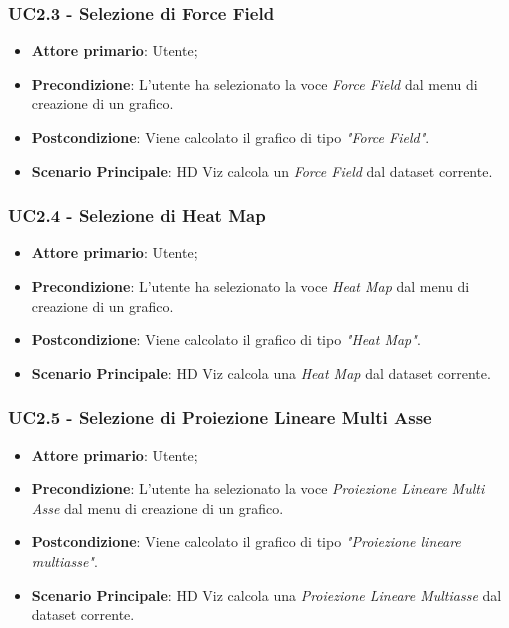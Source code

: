 \subsubsection{UC2.3 - Selezione di Force Field}
\label{ssub:uc2.3}
\begin{itemize}

    \item \textbf{Attore primario}: Utente;

    \item \textbf{Precondizione}:   L'utente ha selezionato la voce \emph{Force Field} dal menu di creazione di un grafico.

    \item \textbf{Postcondizione}:  Viene calcolato il grafico di tipo \emph{"Force Field"}.
	
	\item \textbf{Scenario Principale}: HD Viz calcola un \emph{Force Field} dal dataset corrente.

\end{itemize}


\subsubsection{UC2.4 - Selezione di Heat Map}
\label{ssub:uc2.4}
\begin{itemize}

    \item \textbf{Attore primario}: Utente;

	\item \textbf{Precondizione}:   L'utente ha selezionato la voce \emph{Heat Map} dal menu di creazione di un grafico.

    \item \textbf{Postcondizione}:  Viene calcolato il grafico di tipo \emph{"Heat Map"}.

	\item \textbf{Scenario Principale}: HD Viz calcola una \emph{Heat Map} dal dataset corrente.

\end{itemize}


\subsubsection{UC2.5 - Selezione di Proiezione Lineare Multi Asse}
\label{ssub:uc2.5}
\begin{itemize}

    \item \textbf{Attore primario}: Utente;

    \item \textbf{Precondizione}:   L'utente ha selezionato la voce \emph{Proiezione Lineare Multi Asse} dal menu di creazione di un grafico.

    \item \textbf{Postcondizione}:  Viene calcolato il grafico di tipo \emph{"Proiezione lineare multiasse"}.

	\item \textbf{Scenario Principale}: HD Viz calcola una \emph{Proiezione Lineare Multiasse} dal dataset corrente.
\end{itemize}

